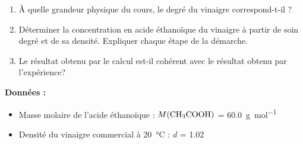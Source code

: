 \documentclass[a4paper,11pt,fleqn]{article}%
\begin{document}
\begin{enumerate}[resume]
	\item À quelle grandeur physique du cours, le degré du vinaigre correspond-t-il ?
	\item Déterminer la concentration en acide éthanoïque du vinaigre à partir de soin degré et de sa densité. Expliquer chaque étape de la démarche.
	\item Le résultat obtenu par le calcul est-il cohérent avec le résultat obtenu par l'expérience?
\end{enumerate}

\colorbox{yellow!40}{
\begin{minipage}{.97\textwidth}
\textbf{Données :}
\begin{itemize}
	\item Masse molaire de l'acide éthanoïque : $M(\ce{CH3COOH})$ = \SI{60,0}{\gram\per\mole}
	\item Densité du vinaigre commercial à \SI{20}{\celsius} : $d$ = \num{1,02}
\end{itemize}
\end{minipage}
}
\end{document}
